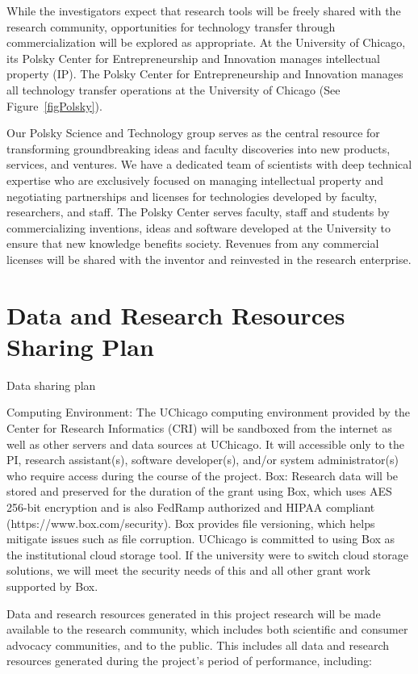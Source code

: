 \documentclass[onecolumn, compsoc,12pt]{IEEEtran}
\begin{document}
While the investigators expect that research tools will be freely shared with the research community, opportunities for technology transfer through commercialization will be explored as appropriate. At the University of Chicago, its Polsky Center for Entrepreneurship and Innovation manages intellectual property (IP). The Polsky Center for Entrepreneurship and Innovation manages all technology transfer operations at the University of Chicago (See Figure~\ref{figPolsky}).

Our Polsky Science and Technology group serves as the central resource for transforming groundbreaking ideas and faculty discoveries into new products, services, and ventures. We have a dedicated team of scientists with deep technical expertise who are exclusively focused on managing intellectual property and negotiating partnerships and licenses for technologies developed by faculty, researchers, and staff. The Polsky Center serves faculty, staff and students by commercializing inventions, ideas and software developed at the University to ensure that new knowledge benefits society. Revenues from any commercial licenses will be shared with the inventor and reinvested in the research enterprise.



\clearpage

\section*{Data and Research Resources Sharing Plan}
        Data sharing plan

              Computing Environment: The UChicago computing environment provided by the Center for Research Informatics (CRI) will be sandboxed from the internet as well as other servers and data sources at UChicago. It will accessible only to the PI, research assistant(s), software developer(s), and/or system administrator(s) who require access during the course of the project.
Box: Research data will be stored and preserved for the duration of the grant using Box, which uses AES 256-bit encryption and is also FedRamp authorized and HIPAA compliant (https://www.box.com/security). Box provides file versioning, which helps mitigate issues such as file corruption. UChicago is committed to using Box as the institutional cloud storage tool. If the university were to switch cloud storage solutions, we will meet the security needs of this and all other grant work supported by Box.


              Data and research resources generated in this project research will be made available to the research community, which includes both scientific and consumer advocacy communities, and to the public. This includes all data and research resources generated during the project’s period of performance, including:
\end{document}
